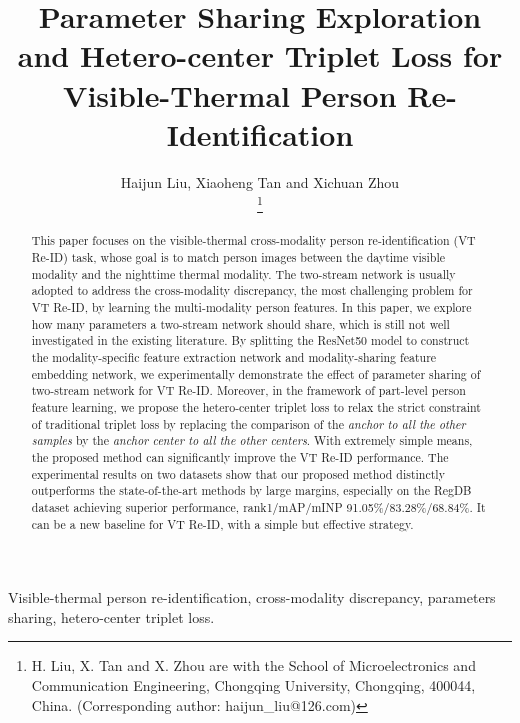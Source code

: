 \documentclass[journal]{IEEEtran}
\begin{document}
\title{Parameter Sharing Exploration and Hetero-center Triplet Loss for Visible-Thermal Person Re-Identification}

\author{Haijun Liu, Xiaoheng Tan and Xichuan Zhou

\thanks{H. Liu, X. Tan and X. Zhou are with the School of Microelectronics and Communication Engineering, Chongqing University, Chongqing, 400044, China. (Corresponding author: haijun\_liu@126.com)}}



\maketitle

\begin{abstract}
This paper focuses on the visible-thermal cross-modality person re-identification (VT Re-ID) task, whose goal is to match person images between the daytime visible modality and the nighttime thermal modality. The two-stream network is usually adopted to address the cross-modality discrepancy, the most challenging problem for VT Re-ID, by learning the multi-modality person features. In this paper, we explore how many parameters a two-stream network should share, which is still not well investigated in the existing literature. By splitting the ResNet50 model to construct the modality-specific feature extraction network and modality-sharing feature embedding network, we experimentally demonstrate the effect of parameter sharing of two-stream network for VT Re-ID.
Moreover, in the framework of part-level person feature learning, we propose the hetero-center triplet loss to relax the strict constraint of traditional triplet loss by replacing the comparison of the \emph{anchor to all the other samples} by the \emph{anchor center to all the other centers}.
With extremely simple means, the proposed method can significantly improve the VT Re-ID performance.
The experimental results on two datasets show that our proposed method distinctly outperforms the state-of-the-art methods by large margins, especially on the RegDB dataset achieving superior performance, rank1/mAP/mINP 91.05\%/83.28\%/68.84\%. It can be a new baseline for VT Re-ID, with a simple but effective strategy.

\end{abstract}

\begin{IEEEkeywords}
 Visible-thermal person re-identification, cross-modality discrepancy, parameters sharing, hetero-center triplet loss.
\end{IEEEkeywords}
\end{document}
